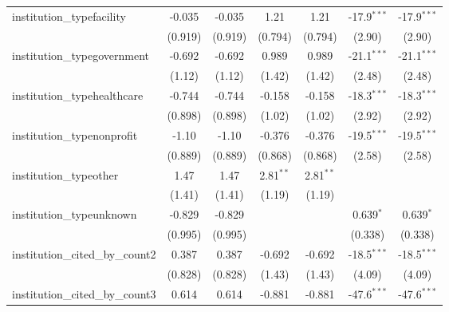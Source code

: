 \begin{tabular}{lcccccc}
   institution\_typefacility             & -0.035        & -0.035        & 1.21          & 1.21          & -17.9$^{***}$ & -17.9$^{***}$\\   
                                         & (0.919)       & (0.919)       & (0.794)       & (0.794)       & (2.90)        & (2.90)\\   
   institution\_typegovernment           & -0.692        & -0.692        & 0.989         & 0.989         & -21.1$^{***}$ & -21.1$^{***}$\\   
                                         & (1.12)        & (1.12)        & (1.42)        & (1.42)        & (2.48)        & (2.48)\\   
   institution\_typehealthcare           & -0.744        & -0.744        & -0.158        & -0.158        & -18.3$^{***}$ & -18.3$^{***}$\\   
                                         & (0.898)       & (0.898)       & (1.02)        & (1.02)        & (2.92)        & (2.92)\\   
   institution\_typenonprofit            & -1.10         & -1.10         & -0.376        & -0.376        & -19.5$^{***}$ & -19.5$^{***}$\\   
                                         & (0.889)       & (0.889)       & (0.868)       & (0.868)       & (2.58)        & (2.58)\\   
   institution\_typeother                & 1.47          & 1.47          & 2.81$^{**}$   & 2.81$^{**}$   &               &   \\   
                                         & (1.41)        & (1.41)        & (1.19)        & (1.19)        &               &   \\   
   institution\_typeunknown              & -0.829        & -0.829        &               &               & 0.639$^{*}$   & 0.639$^{*}$\\   
                                         & (0.995)       & (0.995)       &               &               & (0.338)       & (0.338)\\   
   institution\_cited\_by\_count2        & 0.387         & 0.387         & -0.692        & -0.692        & -18.5$^{***}$ & -18.5$^{***}$\\   
                                         & (0.828)       & (0.828)       & (1.43)        & (1.43)        & (4.09)        & (4.09)\\   
   institution\_cited\_by\_count3        & 0.614         & 0.614         & -0.881        & -0.881        & -47.6$^{***}$ & -47.6$^{***}$\\   

\end{tabular}
